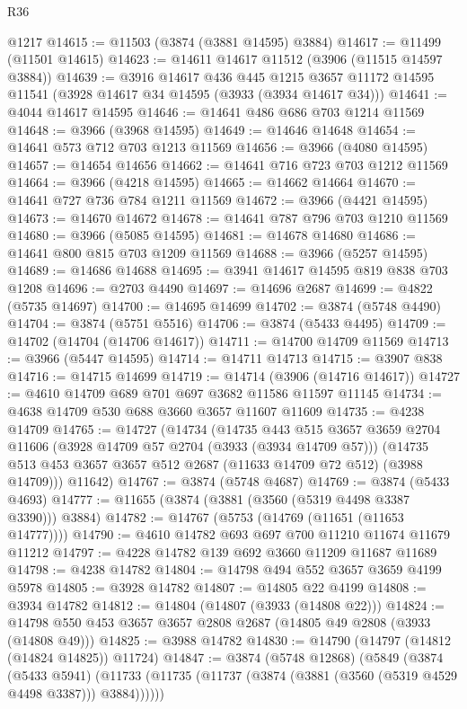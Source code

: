 \begin{lexlean}{R36}
\begin{coremodule}
    @1217
@14615 := @11503 (@3874 (@3881 @14595) @3884)
@14617 := @11499 (@11501 @14615)
@14623 := @14611 @14617 @11512 (@3906 (@11515 @14597 @3884))
@14639 := @3916
    @14617
    @436
    @445
    @1215
    @3657
    @11172
    @14595
    @11541
    (@3928 @14617 @34 @14595 (@3933 (@3934 @14617 @34)))
@14641 := @4044 @14617 @14595
@14646 := @14641 @486 @686 @703 @1214 @11569
@14648 := @3966 (@3968 @14595)
@14649 := @14646 @14648
@14654 := @14641 @573 @712 @703 @1213 @11569
@14656 := @3966 (@4080 @14595)
@14657 := @14654 @14656
@14662 := @14641 @716 @723 @703 @1212 @11569
@14664 := @3966 (@4218 @14595)
@14665 := @14662 @14664
@14670 := @14641 @727 @736 @784 @1211 @11569
@14672 := @3966 (@4421 @14595)
@14673 := @14670 @14672
@14678 := @14641 @787 @796 @703 @1210 @11569
@14680 := @3966 (@5085 @14595)
@14681 := @14678 @14680
@14686 := @14641 @800 @815 @703 @1209 @11569
@14688 := @3966 (@5257 @14595)
@14689 := @14686 @14688
@14695 := @3941 @14617 @14595 @819 @838 @703 @1208
@14696 := @2703 @4490
@14697 := @14696 @2687
@14699 := @4822 (@5735 @14697)
@14700 := @14695 @14699
@14702 := @3874 (@5748 @4490)
@14704 := @3874 (@5751 @5516)
@14706 := @3874 (@5433 @4495)
@14709 := @14702 (@14704 (@14706 @14617))
@14711 := @14700 @14709 @11569
@14713 := @3966 (@5447 @14595)
@14714 := @14711 @14713
@14715 := @3907 @838
@14716 := @14715 @14699
@14719 := @14714 (@3906 (@14716 @14617))
@14727 := @4610 @14709 @689 @701 @697 @3682 @11586 @11597 @11145
@14734 := @4638 @14709 @530 @688 @3660 @3657 @11607 @11609
@14735 := @4238 @14709
@14765 := @14727
    (@14734
      (@14735
        @443
        @515
        @3657
        @3659
        @2704
        @11606
        (@3928 @14709 @57 @2704 (@3933 (@3934 @14709 @57)))
        (@14735 @513 @453 @3657 @3657 @512 @2687 (@11633 @14709 @72 @512) (@3988 @14709)))
      @11642)
@14767 := @3874 (@5748 @4687)
@14769 := @3874 (@5433 @4693)
@14777 := @11655 (@3874 (@3881 (@3560 (@5319 @4498 @3387 @3390))) @3884)
@14782 := @14767 (@5753 (@14769 (@11651 (@11653 @14777))))
@14790 := @4610 @14782 @693 @697 @700 @11210 @11674 @11679 @11212
@14797 := @4228 @14782 @139 @692 @3660 @11209 @11687 @11689
@14798 := @4238 @14782
@14804 := @14798 @494 @552 @3657 @3659 @4199 @5978
@14805 := @3928 @14782
@14807 := @14805 @22 @4199
@14808 := @3934 @14782
@14812 := @14804 (@14807 (@3933 (@14808 @22)))
@14824 := @14798 @550 @453 @3657 @3657 @2808 @2687 (@14805 @49 @2808 (@3933 (@14808 @49)))
@14825 := @3988 @14782
@14830 := @14790 (@14797 (@14812 (@14824 @14825)) @11724)
@14847 := @3874
    (@5748 @12868)
    (@5849
      (@3874
        (@5433 @5941)
        (@11733 (@11735 (@11737 (@3874 (@3881 (@3560 (@5319 @4529 @4498 @3387))) @3884))))))

\end{coremodule}
\end{lexlean}
